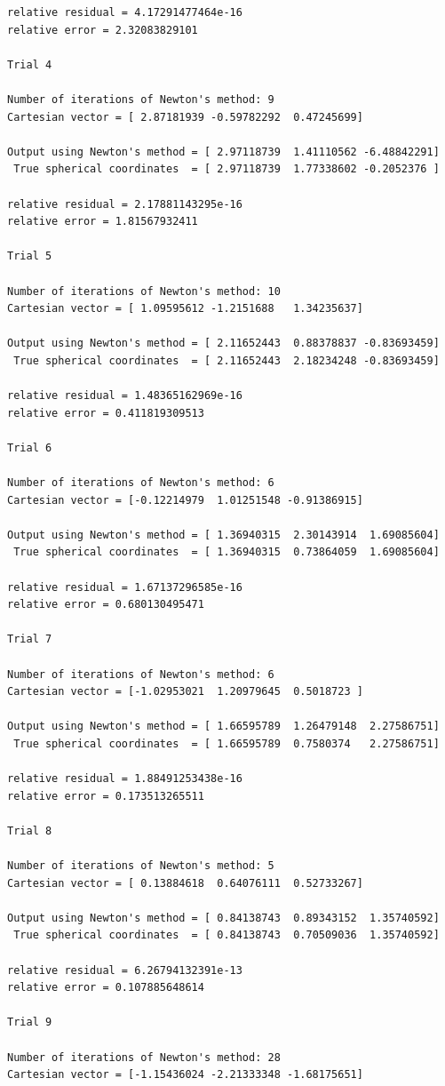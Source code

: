 \documentclass[10pt]{article}
\begin{document}
\begin{enumerate}
\begin{verbatim}
relative residual = 4.17291477464e-16
relative error = 2.32083829101

Trial 4

Number of iterations of Newton's method: 9
Cartesian vector = [ 2.87181939 -0.59782292  0.47245699]

Output using Newton's method = [ 2.97118739  1.41110562 -6.48842291]
 True spherical coordinates  = [ 2.97118739  1.77338602 -0.2052376 ]

relative residual = 2.17881143295e-16
relative error = 1.81567932411

Trial 5

Number of iterations of Newton's method: 10
Cartesian vector = [ 1.09595612 -1.2151688   1.34235637]

Output using Newton's method = [ 2.11652443  0.88378837 -0.83693459]
 True spherical coordinates  = [ 2.11652443  2.18234248 -0.83693459]

relative residual = 1.48365162969e-16
relative error = 0.411819309513

Trial 6

Number of iterations of Newton's method: 6
Cartesian vector = [-0.12214979  1.01251548 -0.91386915]

Output using Newton's method = [ 1.36940315  2.30143914  1.69085604]
 True spherical coordinates  = [ 1.36940315  0.73864059  1.69085604]

relative residual = 1.67137296585e-16
relative error = 0.680130495471

Trial 7

Number of iterations of Newton's method: 6
Cartesian vector = [-1.02953021  1.20979645  0.5018723 ]

Output using Newton's method = [ 1.66595789  1.26479148  2.27586751]
 True spherical coordinates  = [ 1.66595789  0.7580374   2.27586751]

relative residual = 1.88491253438e-16
relative error = 0.173513265511

Trial 8

Number of iterations of Newton's method: 5
Cartesian vector = [ 0.13884618  0.64076111  0.52733267]

Output using Newton's method = [ 0.84138743  0.89343152  1.35740592]
 True spherical coordinates  = [ 0.84138743  0.70509036  1.35740592]

relative residual = 6.26794132391e-13
relative error = 0.107885648614

Trial 9

Number of iterations of Newton's method: 28
Cartesian vector = [-1.15436024 -2.21333348 -1.68175651]


\end{verbatim}
\end{enumerate}
\end{document}
